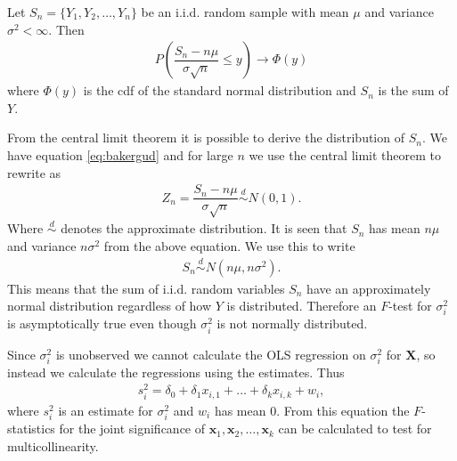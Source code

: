 \begin{theorem} \label{th:Central_limit_theorem}
Let $S_n = \{ Y_1, Y_2, \ldots, Y_n \}$ be an i.i.d.$\!$ random sample with mean $\mu$ and variance $\sigma^2 < \infty$. Then
\begin{align} \label{eq:bakergud}
    P\left(\dfrac{S_n - n\mu}{\sigma \sqrt{n}}\leq y\right) \rightarrow \Phi(y)
\end{align}
where $\Phi(y)$ is the cdf of the standard normal distribution and $S_n$ is the sum of $Y$. 
\end{theorem}
From the central limit theorem it is possible to derive the distribution of $S_n$. 
We have equation \eqref{eq:bakergud} and for large $n$ we use the central limit theorem to rewrite as
\begin{align*}
    Z_n = \dfrac{S_n - n\mu}{\sigma \sqrt{n}} \stackrel{d}{\sim} N(0,1). 
\end{align*}
Where $\stackrel{d}{\sim}$ denotes the approximate distribution. It is seen that $S_n$ has mean $n\mu$ and variance $n \sigma^2$ from the above equation. We use this to write
\begin{align*}
    S_n \stackrel{d}{\sim} N(n\mu, n\sigma^2). 
\end{align*}
This means that the sum of i.i.d. random variables $S_n$ have an approximately normal distribution regardless of how $Y$ is distributed. Therefore an $F$-test for $\sigma_i^2$ is asymptotically true even though $\sigma_i^2$ is not normally distributed.  




Since $\sigma^2_i$ is unobserved we cannot calculate the OLS regression on $\sigma_i^2$ for $\mathbf{X}$, so instead we calculate the regressions using the estimates. Thus
\begin{align}\label{eq:OLS_residual_hat_epsioln_i_anden}
    s_i^2 = \delta_0 + \delta_1x_{i,1} + \ldots + \delta_kx_{i,k} + w_i,
\end{align}
where $s^2_i$ is an estimate for $\sigma^2_i$ and $w_i$ has mean 0. From this equation the $F$-statistics for the joint significance of $\textbf{x}_1, \textbf{x}_2, \ldots, \textbf{x}_k$ can be calculated to test for multicollinearity.

